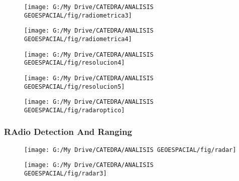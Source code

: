 \documentclass[14pt]{beamer}
\begin{document}
\begin{frame}
 \begin{figure}
    \centering
    \texttt{[image: G:/My Drive/CATEDRA/ANALISIS GEOESPACIAL/fig/radiometrica3]}
  \end{figure}
\end{frame}
\begin{frame}
 \begin{figure}
    \centering
    \texttt{[image: G:/My Drive/CATEDRA/ANALISIS GEOESPACIAL/fig/radiometrica4]}
  \end{figure}
\end{frame}
\begin{frame}
 \begin{figure}
    \centering
    \texttt{[image: G:/My Drive/CATEDRA/ANALISIS GEOESPACIAL/fig/resolucion4]}
  \end{figure}
\end{frame}
\begin{frame}
 \begin{figure}
    \centering
    \texttt{[image: G:/My Drive/CATEDRA/ANALISIS GEOESPACIAL/fig/resolucion5]}
  \end{figure}
\end{frame}
\begin{frame}
 \begin{figure}
    \centering
    \texttt{[image: G:/My Drive/CATEDRA/ANALISIS GEOESPACIAL/fig/radaroptico]}
  \end{figure}
\end{frame}
\begin{frame}
\frametitle{\textbf{RA}dio \textbf{D}etection \textbf{A}nd \textbf{R}anging}
 \begin{figure}
    \centering
    \texttt{[image: G:/My Drive/CATEDRA/ANALISIS GEOESPACIAL/fig/radar]}
  \end{figure}
\end{frame}
\begin{frame}
 \begin{figure}
    \centering
    \texttt{[image: G:/My Drive/CATEDRA/ANALISIS GEOESPACIAL/fig/radar3]}
  \end{figure}
\end{frame}
\end{document}
